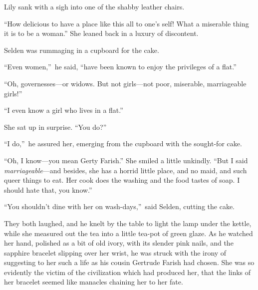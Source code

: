 \documentclass[12pt,a4paper]{book}
\begin{document}
Lily sank with a sigh into one of the shabby leather chairs.





``How delicious to have a place like this all to one's self! What
a miserable thing it is to be a woman.'' She leaned back in a
luxury of discontent.





Selden was rummaging in a cupboard for the cake.





``Even women,''\ he said, ``have been known to enjoy the privileges
of a flat.''





``Oh, governesses---or widows. But not girls---not poor, miserable,
marriageable girls!''





``I even know a girl who lives in a flat.''





She sat up in surprise. ``You do?''





``I do,''\ he assured her, emerging from the cupboard with the
sought-for cake.





``Oh, I know---you mean Gerty Farish.'' She smiled a little
unkindly. ``But I said \textit{marriageable}---and besides, she has a horrid
little place, and no maid, and such queer things to eat. Her cook
does the washing and the food tastes of soap. I should hate that,
you know.''





``You shouldn't dine with her on wash-days,''\ said Selden, cutting
the cake.





They both laughed, and he knelt by the table to light the lamp
under the kettle, while she measured out the tea into a little
tea-pot of green glaze. As he watched her hand, polished as a bit
of old ivory, with its slender pink nails, and the sapphire
bracelet slipping over her wrist, he was struck with the irony of
suggesting to her such a life as his cousin Gertrude Farish had
chosen. She was so evidently the victim of the civilization which
had produced her, that the links of her bracelet seemed like
manacles chaining her to her fate.
\end{document}
